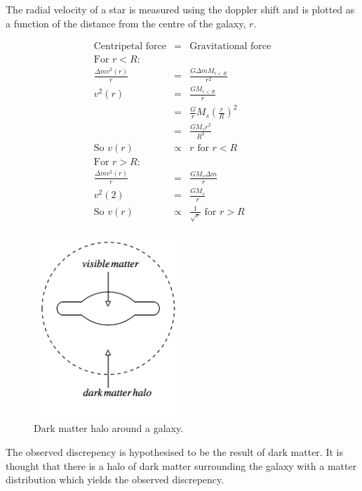 The radial velocity of a star is measured using the doppler shift and is plotted as a function of the distance from the centre of the galaxy, $r$.

\begin{eqnarray*}
  \textrm{Centripetal force} & = & \textrm{Gravitational force} \\
  \textrm{For } r<R : && \\
  \frac{\Delta m v^2(r)}{r} & = & \frac{G \Delta m M_{r<R}}{r^2} \\
  v^2(r) & = & \frac{GM_{r<R}}{r} \\
  & = & \frac{G}{r}M_s \left( \frac{r}{R} \right)^2 \\
  & = & \frac{GM_sr^2}{R^3} \\
  \textrm{So } v(r) & \propto & r \textrm{ for } r<R \\
  \textrm{For } r>R: && \\
  \frac{\Delta m v^2(r)}{r} & = & \frac{GM_s \Delta m}{r} \\
  v^2(2) & = & \frac{GM_s}{r} \\
  \textrm{So } v(r) & \propto & \frac{1}{\sqrt{r}} \textrm{ for } r>R
\end{eqnarray*}

\begin{figure}[!htb]
  \begin{center}
    \includegraphics[width=0.5\textwidth]{images/web_feynman/image_88.png}
    \caption[Dark matter halo around a galaxy]{Dark matter halo around a galaxy.}
    \label{fig:ch1_darkMatterHalo}
  \end{center}
\end{figure}

The observed discrepency is hypothesised to be the result of dark matter.  It is thought that there is a halo of dark matter surrounding the galaxy with a matter distribution which yields the observed discrepency.


